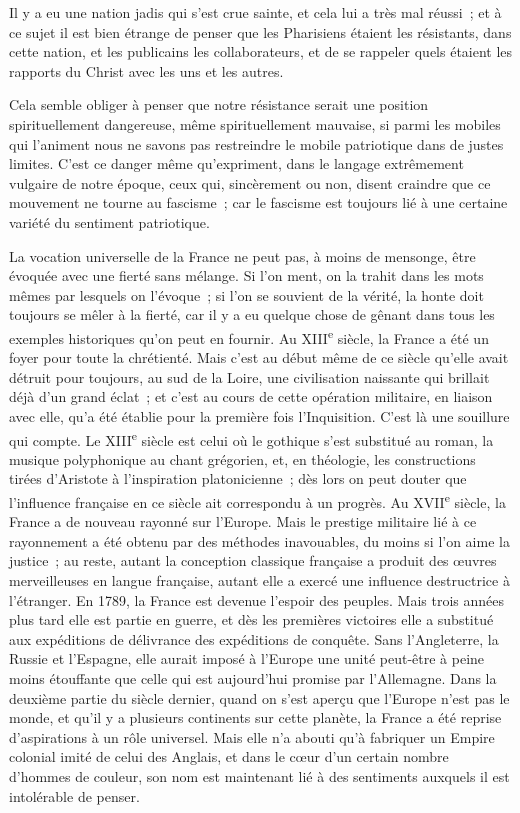 \documentclass[french,twoside]{book} %
\begin{document}
Il y a eu une nation jadis qui s'est crue sainte, et cela lui a très mal réussi ; et à ce sujet il est bien étrange de penser que les Pharisiens étaient les résistants, dans cette nation, et les publicains les collaborateurs, et de se rappeler quels étaient les rapports du Christ avec les uns et les autres.\par
Cela semble obliger à penser que notre résistance serait une position spirituellement dangereuse, même spirituellement mauvaise, si parmi les mobiles qui l'animent nous ne savons pas restreindre le mobile patriotique dans de justes limites. C'est ce danger même qu'expriment, dans le langage extrêmement vulgaire de notre époque, ceux qui, sincèrement ou non, disent craindre que ce mouvement ne tourne au fascisme ; car le fascisme est toujours lié à une certaine variété du sentiment patriotique.\par
La vocation universelle de la France ne peut pas, à moins de mensonge, être évoquée avec une fierté sans mélange. Si l'on ment, on la trahit dans les mots mêmes par lesquels on l'évoque ; si l'on se souvient de la vérité, la honte doit toujours se mêler à la fierté, car il y a eu quelque chose de gênant dans tous les exemples historiques qu'on peut en fournir. Au XIII\textsuperscript{e} siècle, la France a été un foyer pour toute la chrétienté. Mais c'est au début même de ce siècle qu'elle avait détruit pour toujours, au sud de la Loire, une civilisation naissante qui brillait déjà d'un grand éclat ; et c'est au cours de cette opération militaire, en liaison avec elle, qu'a été établie pour la première fois l'Inquisition. C'est là une souillure qui compte. Le XIII\textsuperscript{e} siècle est celui où le gothique s'est substitué au roman, la musique polyphonique au chant grégorien, et, en théologie, les constructions tirées d'Aristote à l'inspiration platonicienne ; dès lors on peut douter que l'influence française en ce siècle ait correspondu à un progrès. Au XVII\textsuperscript{e} siècle, la France a de nouveau rayonné sur l'Europe. Mais le prestige militaire lié à ce rayonnement a été obtenu par des méthodes inavouables, du moins si l'on aime la justice ; au reste, autant la conception classique française a produit des œuvres merveilleuses en langue française, autant elle a exercé une influence destructrice à l'étranger. En 1789, la France est devenue l'espoir des peuples. Mais trois années plus tard elle est partie en guerre, et dès les premières victoires elle a substitué aux expéditions de délivrance des expéditions de conquête. Sans l'Angleterre, la Russie et l'Espagne, elle aurait imposé à l'Europe une unité peut-être à peine moins étouffante que celle qui est aujourd'hui promise par l'Allemagne. Dans la deuxième partie du siècle dernier, quand on s'est aperçu que l'Europe n'est pas le monde, et qu'il y a plusieurs continents sur cette planète, la France a été reprise d'aspirations à un rôle universel. Mais elle n'a abouti qu'à fabriquer un Empire colonial imité de celui des Anglais, et dans le cœur d'un certain nombre d'hommes de couleur, son nom est maintenant lié à des sentiments auxquels il est intolérable de penser.\par
\end{document}

